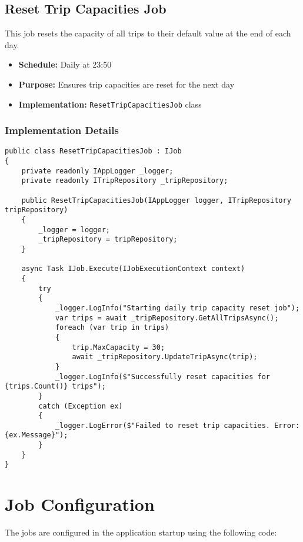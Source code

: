 \subsection{Reset Trip Capacities Job}
This job resets the capacity of all trips to their default value at the end of each day.

\begin{itemize}
    \item \textbf{Schedule:} Daily at 23:50
    \item \textbf{Purpose:} Ensures trip capacities are reset for the next day
    \item \textbf{Implementation:} \texttt{ResetTripCapacitiesJob} class
\end{itemize}

\subsubsection{Implementation Details}
\begin{lstlisting}[language=CSharp]
public class ResetTripCapacitiesJob : IJob
{
    private readonly IAppLogger _logger;
    private readonly ITripRepository _tripRepository;

    public ResetTripCapacitiesJob(IAppLogger logger, ITripRepository tripRepository)
    {
        _logger = logger;
        _tripRepository = tripRepository;
    }

    async Task IJob.Execute(IJobExecutionContext context)
    {
        try
        {
            _logger.LogInfo("Starting daily trip capacity reset job");
            var trips = await _tripRepository.GetAllTripsAsync();
            foreach (var trip in trips)
            {
                trip.MaxCapacity = 30;
                await _tripRepository.UpdateTripAsync(trip);
            }
            _logger.LogInfo($"Successfully reset capacities for {trips.Count()} trips");
        }
        catch (Exception ex)
        {
            _logger.LogError($"Failed to reset trip capacities. Error: {ex.Message}");
        }
    }
}
\end{lstlisting}

\section{Job Configuration}
The jobs are configured in the application startup using the following code:

